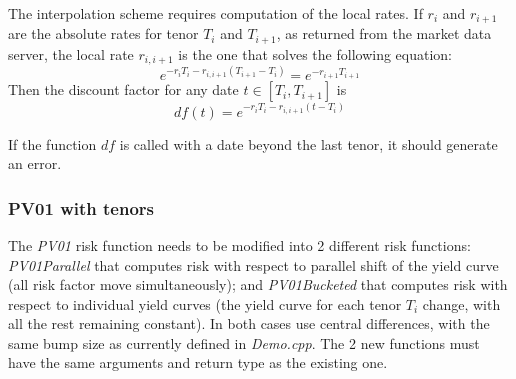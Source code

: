 \documentclass[10pt]{article}
\begin{document}
The interpolation scheme requires computation of the local rates. If $r_i$ and $r_{i+1}$ are the absolute rates for tenor $T_i$ and $T_{i+1}$, as returned from the market data server, the local rate $r_{i,i+1}$ is the one that solves the following equation:
$$e^{-r_iT_i-r_{i,i+1}(T_{i+1}-T_i)}=e^{-r_{i+1}T_{i+1}}$$
Then the discount factor for any date $t \in [T_i,T_{i+1}]$ is $$df(t)=e^{-r_i T_i-r_{i,i+1}(t-T_i)}$$

If the function $df$ is called with a date beyond the last tenor, it should generate an error.

\subsubsection{PV01 with tenors}
\label{sec:pv01}
The \textit{PV01} risk function needs to be modified into 2 different risk functions: \textit{PV01Parallel} that computes risk with respect to parallel shift of the yield curve (all risk factor move simultaneously); and \textit{PV01Bucketed} that computes risk with respect to individual yield curves (the yield curve for each tenor $T_i$ change, with all the rest remaining constant). In both cases use central differences, with the same bump size as currently defined in \textit{Demo.cpp}. The 2 new functions must have the same arguments and return type as the existing one. \\
\end{document}
